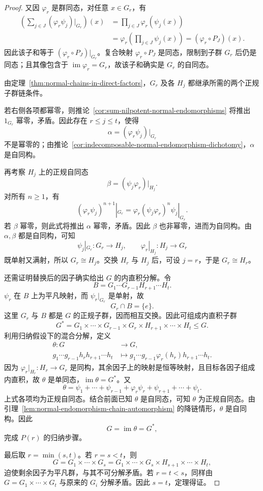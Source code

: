 \begin{proof}
又因 $\varphi_r$ 是群同态，对任意 $x\in G_r$，有
\[
  \begin{aligned}
    \left(\sum_{j\in J}(\varphi_r\psi_j)|_{G_r}\right)(x)
      &=\prod_{j\in J}\varphi_r(\psi_j(x))\\
      &=\varphi_r\!\left(\prod_{j\in J}\psi_j(x)\right)
       =(\varphi_r\circ P_J)(x).
  \end{aligned}
\]
因此该子和等于 $(\varphi_r\circ P_J)|_{G_r}$。复合映射 $\varphi_r\circ P_J$ 是同态，限制到子群 $G_r$ 后仍是同态；且其像包含于 $\operatorname{im}\varphi_r=G_r$，故该子和确实是 $G_r$ 的自同态。

由定理~\ref{thm:normal-chains-in-direct-factors}，$G_r$ 及各 $H_j$ 都继承所需的两个正规子群链条件。

若右侧各项都幂零，则推论~\ref{cor:sum-nilpotent-normal-endomorphisms} 将推出 $1_{G_r}$ 幂零，矛盾。因此存在 $r\leq j\leq t$，使得
\[
  \alpha=(\varphi_r\psi_j)|_{G_r}
\]
不是幂零的；由推论~\ref{cor:indecomposable-normal-endomorphism-dichotomy}，$\alpha$ 是自同构。

再考察 $H_j$ 上的正规自同态
\[
  \beta=(\psi_j\varphi_r)|_{H_j}.
\]
对所有 $n\geq1$，有
\[
  (\varphi_r\psi_j)^{n+1}|_{G_r}
  =\varphi_r(\psi_j\varphi_r)^n\psi_j|_{G_r}.
\]
若 $\beta$ 幂零，则此式将推出 $\alpha$ 幂零，矛盾。因此 $\beta$ 也非幂零，进而为自同构。由 $\alpha,\beta$ 都是自同构，可知
\[
  \psi_j|_{G_r}:G_r\longrightarrow H_j,\qquad
  \varphi_r|_{H_j}:H_j\longrightarrow G_r
\]
既单射又满射，所以 $G_r\cong H_j$。交换 $H_r$ 与 $H_j$ 后，可设 $j=r$，于是 $G_r\cong H_r$。

还需证明替换后的因子确实给出 $G$ 的内直积分解。令
\[
  B=G_1\cdots G_{r-1}H_{r+1}\cdots H_t.
\]
$\psi_r$ 在 $B$ 上为平凡映射，而 $\psi_r|_{G_r}$ 是单射，故
\[
  G_r\cap B=\{e\}.
\]
这里 $G_r$ 与 $B$ 都是 $G$ 的正规子群，因而相互交换。因此可组成内直积子群
\[
  G^*=G_1\times\cdots\times G_{r-1}\times G_r
          \times H_{r+1}\times\cdots\times H_t\leq G.
\]
利用归纳假设下的混合分解，定义
\[
  \begin{aligned}
    \theta:G&\longrightarrow G,\\
    g_1\cdots g_{r-1}h_rh_{r+1}\cdots h_t
      &\longmapsto
    g_1\cdots g_{r-1}\varphi_r(h_r)h_{r+1}\cdots h_t.
  \end{aligned}
\]
因为 $\varphi_r|_{H_r}:H_r\to G_r$ 是同构，其余因子上的映射是恒等映射，且目标各因子组成内直积，故 $\theta$ 是单同态，$\operatorname{im}\theta=G^*$。又
\[
  \theta=\psi_1+\cdots+\psi_{r-1}
          +\varphi_r\psi_r+\psi_{r+1}+\cdots+\psi_t.
\]
上式各项均为正规自同态。结合前面已知 $\theta$ 是自同态，可知 $\theta$ 为正规自同态。由引理~\ref{lem:normal-endomorphism-chain-automorphism} 的降链情形，$\theta$ 是自同构。因此
\[
  G=\operatorname{im}\theta=G^*,
\]
完成 $P(r)$ 的归纳步骤。

最后取 $r=\min(s,t)$。若 $r=s<t$，则
\[
  G=G_1\times\cdots\times G_s
   =G_1\times\cdots\times G_s\times H_{s+1}\times\cdots\times H_t,
\]
迫使剩余因子为平凡群，与其不可分解矛盾。若 $r=t<s$，同样由
$G=G_1\times\cdots\times G_t$ 与原来的 $G_i$ 分解矛盾。因此 $s=t$，定理得证。
\end{proof}

